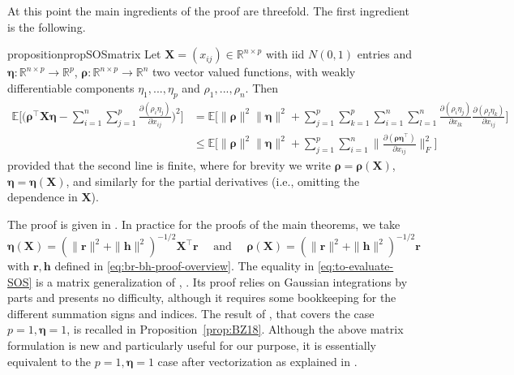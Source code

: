 \documentclass[11pt]{amsart}
\numberwithin{equation}{section}
\numberwithin{equation}{section}
\def\real{{\mathbb{R}}}
\def\R{{\real}}
\def\E{{\mathbb{E}}}
\def\mathbold{\boldsymbol} %
\def\bh{\mathbold{h}}\def\hhat{\widehat{h}}\def\htil{\widetilde{h}}
\def\br{\mathbold{r}}\def\rhat{\widehat{r}}\def\rtil{\widetilde{r}}\def\rbar{{\overline r}}\def\brbar{{\overline \br}}
\def\bX{\mathbold{X}}\def\hbX{{\widehat{\bX}}}\def\tbX{{\widetilde{\bX}}}\def\bXbar{{\overline \bX}}
\def\bfeta{\mathbold{\eta}}\def\etahat{\widehat{\eta}}\def\heta{\widehat{\eta}}
\def\brho{\mathbold{\rho}}\def\rhohat{\widehat{\rho}}\def\hrho{\widehat{\rho}}
\begin{document}
At this point the main ingredients of the proof are threefold.
The first ingredient is the following.
\begin{restatable*}{proposition}{propSOSmatrix}
    \label{prop:SOS-X-D-bh-br-main-text}
    Let $\bX=(x_{ij})\in\R^{n\times p}$ with  iid $N(0,1)$ entries and $\bfeta:\R^{n\times p}\to \R^p$,
    $\brho:\R^{n\times p}\to \R^n$ two vector valued functions,
    with weakly differentiable components
    $\eta_1,...,\eta_p$ and $\rho_1,...,\rho_n$.
    Then
\begin{align}
    \E\Big[\Big(
            {\brho^\top \bX \bfeta}
    -
    \sum_{i=1}^n
    \sum_{j=1}^p
        \frac{\partial(\rho_i\eta_j)}{\partial x_{ij}}
    \Big)^2
\Big]
    &=
    \E\Big[{\| \brho\|^2 \|\bfeta\|^2}
    +
    \sum_{j=1}^p\sum_{k=1}^p
    \sum_{i=1}^n\sum_{l=1}^n
        \frac{\partial(\rho_i \eta_j)}{\partial x_{lk}}
        \frac{\partial(\rho_l \eta_k)}{\partial x_{ij}}
    \Big]
    \nonumber
    \\ &\le
    \E\Big[{\| \brho\|^2 \|\bfeta\|^2}
    +
    \sum_{j=1}^p
    \sum_{i=1}^n
    \Big\|
        \frac{\partial(\brho \bfeta^\top)}{\partial x_{ij}}
    \Big\|_F^2
    \Big]
\label{eq:to-evaluate-SOS}
\end{align}
    provided that the second line is finite,
    where for brevity we write $\brho=\brho(\bX)$, $\bfeta=\bfeta(\bX)$,
    and similarly for the partial derivatives (i.e.,
    omitting the dependence in $\bX$).
\end{restatable*}
The proof is given in .
In practice for the proofs of the main theorems, we take
\begin{equation}
\bfeta(\bX) =(\|\br\|^2 + \|\bh\|^2)^{-1/2} \bX^\top\br
\quad\text{ and }\quad
\brho(\bX) = (\|\br\|^2 + \|\bh\|^2)^{-1/2} \br 
\label{eq:bfeta-brho}
\end{equation}
with $\br,\bh$ defined in \eqref{eq:br-bh-proof-overview}.
The equality in \eqref{eq:to-evaluate-SOS} is a matrix generalization
of
\cite[Eq. (8.6)]{stein1981estimation}, \cite{bellec_zhang2018second_stein}.
Its proof
relies on Gaussian integrations by parts and presents no difficulty,
although it requires 
some bookkeeping for the different summation signs and indices.
The result of \cite{bellec_zhang2018second_stein}, that covers 
the case $p=1,\bfeta=1$, is recalled in Proposition~\ref{prop:BZ18}.
Although the above matrix formulation is new and particularly
useful for our purpose, it is essentially
equivalent to the $p=1,\bfeta=1$ case after vectorization
as explained in .
\end{document}
